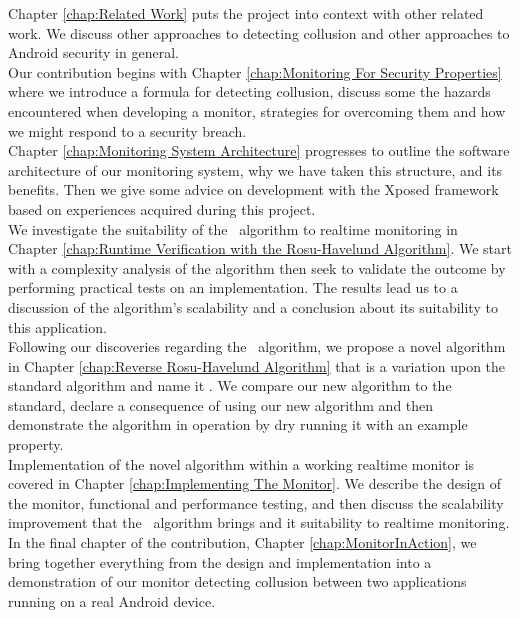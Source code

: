 \noindent Chapter \ref{chap:Related Work} puts the project into context with other related work.  We discuss other approaches to detecting collusion and other approaches to Android security in general.\\

\noindent Our contribution begins with Chapter \ref{chap:Monitoring For Security Properties} where we introduce a formula for detecting collusion, discuss some the hazards encountered when developing a monitor, strategies for overcoming them and how we might respond to a security breach.\\

\noindent Chapter \ref{chap:Monitoring System Architecture} progresses to outline the software architecture of our monitoring system, why we have taken this structure, and its benefits.  Then we give some advice on development with the Xposed framework based on experiences acquired during this project.\\

\noindent We investigate the suitability of the \RH\ algorithm to realtime monitoring in Chapter \ref{chap:Runtime Verification with the Rosu-Havelund Algorithm}.  We start with a complexity analysis of the algorithm then seek to validate the outcome by performing practical tests on an implementation.  The results lead us to a discussion of the algorithm's scalability and a conclusion about its suitability to this application.\\

\noindent Following our discoveries regarding the \RH\ algorithm, we propose a novel algorithm in Chapter \ref{chap:Reverse Rosu-Havelund Algorithm} that is a variation upon the standard algorithm and name it \RRH.  We compare our new algorithm to the standard, declare a consequence of using our new algorithm and then demonstrate the algorithm in operation by dry running it with an example property.\\

\noindent Implementation of the novel algorithm within a working realtime monitor is covered in Chapter \ref{chap:Implementing The Monitor}.  We describe the design of the monitor, functional and performance testing, and then discuss the scalability improvement that the \RRH\ algorithm brings and it suitability to realtime monitoring.\\

\noindent In the final chapter of the contribution, Chapter \ref{chap:MonitorInAction}, we bring together everything from the design and implementation into a demonstration of our monitor detecting collusion between two applications running on a real Android device.\\

